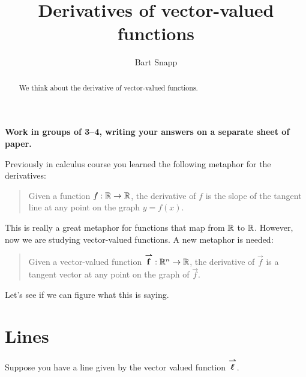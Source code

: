 \documentclass[handout,hints,noauthor,nooutcomes]{ximera}
\author{Bart Snapp}
\title[Collaborate:]{Derivatives of vector-valued functions}
\begin{document}
\begin{abstract}
  We think about the derivative of vector-valued functions.
\end{abstract}
\maketitle

\textbf{Work in groups of 3--4, writing your answers on a separate
  sheet of paper.}


Previously in calculus course you learned the following metaphor for
the derivatives:
\begin{quote}
  Given a function $f:\mathbb R\to\mathbb R$, the derivative of $f$ is the slope of
  the tangent line at any point on the graph $y = f(x)$.
\end{quote}

This is really a great metaphor for functions that map from $\mathbb R$ to
$\mathbb R$. However, now we are studying vector-valued functions. A new
metaphor is needed:
\begin{quote}
  Given a vector-valued function ${\overset{\boldsymbol{\rightharpoonup}}{\mathbf{f}}}:\mathbb R^n\to\mathbb R$, the derivative
  of $\vec{f}$ is a tangent vector at any point on the graph of
  $\vec{f}$.
\end{quote}
Let's see if we can figure what this is saying.

\section{Lines}

Suppose you have a line given by the vector valued function ${\overset{\boldsymbol{\rightharpoonup}}{\mathbf{\boldsymbol{\ell}}}}$.

\begin{image}
\end{image}
\end{document}

